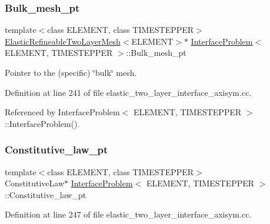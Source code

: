 \subsubsection{\texorpdfstring{Bulk\+\_\+mesh\+\_\+pt}{Bulk\_mesh\_pt}\hspace{0.1cm}{\footnotesize\ttfamily [2/2]}}
{\footnotesize\ttfamily template$<$class E\+L\+E\+M\+E\+NT, class T\+I\+M\+E\+S\+T\+E\+P\+P\+ER$>$ \\
\hyperlink{classElasticRefineableTwoLayerMesh}{Elastic\+Refineable\+Two\+Layer\+Mesh}$<$E\+L\+E\+M\+E\+NT$>$$\ast$ \hyperlink{classInterfaceProblem}{Interface\+Problem}$<$ E\+L\+E\+M\+E\+NT, T\+I\+M\+E\+S\+T\+E\+P\+P\+ER $>$\+::Bulk\+\_\+mesh\+\_\+pt\hspace{0.3cm}{\ttfamily [private]}}



Pointer to the (specific) \char`\"{}bulk\char`\"{} mesh. 



Definition at line 241 of file elastic\+\_\+two\+\_\+layer\+\_\+interface\+\_\+axisym.\+cc.



Referenced by Interface\+Problem$<$ E\+L\+E\+M\+E\+N\+T, T\+I\+M\+E\+S\+T\+E\+P\+P\+E\+R $>$\+::\+Interface\+Problem().

\mbox{\label{classInterfaceProblem_a5bf645cbdbf7775ab6438be324caf3c3}} 
\subsubsection{\texorpdfstring{Constitutive\+\_\+law\+\_\+pt}{Constitutive\_law\_pt}}
{\footnotesize\ttfamily template$<$class E\+L\+E\+M\+E\+NT, class T\+I\+M\+E\+S\+T\+E\+P\+P\+ER$>$ \\
Constitutive\+Law$\ast$ \hyperlink{classInterfaceProblem}{Interface\+Problem}$<$ E\+L\+E\+M\+E\+NT, T\+I\+M\+E\+S\+T\+E\+P\+P\+ER $>$\+::Constitutive\+\_\+law\+\_\+pt\hspace{0.3cm}{\ttfamily [private]}}



Definition at line 247 of file elastic\+\_\+two\+\_\+layer\+\_\+interface\+\_\+axisym.\+cc.

\mbox{\label{classInterfaceProblem_a6ebe4e37868be26465c7bc6d2cef95e7}} 
